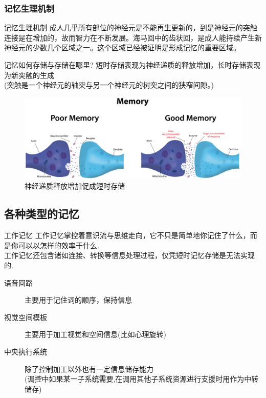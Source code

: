 \documentclass[serif]{beamer}
\begin{document}
  \subsubsection{记忆生理机制}
  \begin{frame}{记忆生理机制}
     成人几乎所有部位的神经元是不能再生更新的，到是神经元的突触连接是在增加的，故而智力在不断发展。海马回中的齿状回，是成人能持续产生新神经元的少数几个区域之一。这个区域已经被证明是形成记忆的重要区域。\\
    \pause
    \begin{block}{记忆如何存储与存储在哪里?}
    	短时存储表现为神经递质的释放增加，长时存储表现为新突触的生成\\
    	(突触是一个神经元的轴突与另一个神经元的树突之间的狭窄间隙。)
    \end{block}
  \end{frame}
  
  \begin{frame}%
       \begin{figure}[t]
       	\centering
        \includegraphics[scale=0.28]{model1.jpg}
        \caption{神经递质释放增加促成短时存储}
       \end{figure}
  \end{frame}

  \subsection{各种类型的记忆}
  \begin{frame}{工作记忆}
      工作记忆掌控着意识流与思维走向，它不只是简单地你记住了什么，而是你可以以怎样的效率干什么.\\
      工作记忆还包含诸如连接、转换等信息处理过程，仅凭短时记忆存储是无法实现的.\\
      \pause
      \begin{description}
      	\item[语音回路] 主要用于记住词的顺序，保持信息
      	\item[视觉空间模板] 主要用于加工视觉和空间信息(比如心理旋转)
      	\item[中央执行系统] 除了控制加工以外也有一定信息储存能力\\(调控中如果某一子系统需要,在调用其他子系统资源进行支援时用作为中转储存)
      \end{description}
  \end{frame}
  
\end{document}
